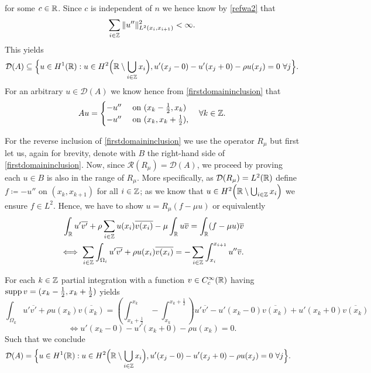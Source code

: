 for some $c \in \mathbb{R}$. Since $c$ is independent of $n$ we hence know by \eqref{refwa2} that
	\[ \sum_{i \in \mathbb{Z}} \|u''\|^{2}_{L^{2}(x_{i}, x_{i+1})} < \infty. \]
This yields
	\begin{equation}
		\mathcal{D}(A) \subseteq \Big\{ u \in H^{1}(\mathbb{R}): u \in H^{2}\Big(\mathbb{R} \setminus \bigcup_{i \in \mathbb{Z}} x_{i} \Big), u'(x_{j} - 0) - u'(x_{j} + 0) - \rho u(x_{j}) = 0 ~\forall j \Big\}. \label{firstdomaininclusion} 
	\end{equation}
For an arbitrary $u \in \mathcal{D}(A)$ we know hence from \eqref{firstdomaininclusion} that
	\[ A u = \begin{cases}
					- u'' & \text{ on } (x_{k} - \frac{1}{2}, x_{k}) \\
					- u'' & \text{ on } (x_{k}, x_{k} + \frac{1}{2}),
			 \end{cases} \quad \forall k \in \mathbb{Z}. \]

For the reverse inclusion of \eqref{firstdomaininclusion} we use the operator $R_{\mu}$ but first let us, again for brevity, denote with $B$ the right-hand side of \eqref{firstdomaininclusion}. Now, since $\mathcal{R}(R_{\mu}) = \mathcal{D}(A)$, we proceed by proving each $u \in B$ is also in the range of $R_{\mu}$. More specifically, as $\mathcal{D}(R_{\mu}) = L^{2}(\mathbb{R})$ define $f \coloneqq - u''$ on $(x_{k}, x_{k + 1})$ for all $i \in \mathbb{Z}$; as we know that $u \in H^{2}\Big(\mathbb{R} \setminus \bigcup_{i \in \mathbb{Z}} x_{i} \Big)$ we ensure $f \in L^{2}$. 
Hence, we have to show $u = R_{\mu}(f - \mu u)$ or equivalently
	\begin{align*}
		 \int_{\mathbb{R}} u' \overline{v'} + \rho \sum_{i \in \mathbb{Z}} u(x_{i}) \overline{v(x_{i})} - \mu \int_{\mathbb{R}} u \overline{v}= \int_{\mathbb{R}}(f-\mu u) \overline{v} \\
		\iff \sum_{i \in \mathbb{Z}} \int_{\Omega_{i}} u' \overline{v'} + \rho u(x_{i}) \overline{v(x_{i})} = - \sum_{i \in \mathbb{Z}} \int_{x_{i}}^{x_{i+1}} u'' \overline{v}.
	\end{align*}


	For each $k \in \mathbb{Z}$ partial integration with a function $v \in C_{c}^{\infty}(\mathbb{R})$ having $\operatorname{supp} v = (x_{k} - \frac{1}{2}, x_{k} + \frac{1}{2})$ yields
	\[ \int_{\Omega_{k}} u' \overline{v'} + \rho u(x_{k}) \overline{v(x_{k})} =\left( \int_{x_{k} + \frac{1}{2}}^{x_{k}} - \int_{x_{k}}^{x_{k} +\frac{1}{2}} \right) u' \overline{v'} - u'(x_{k}-0) \overline{v(x_{k})}  + u'(x_{k}+0) \overline{v(x_{k})}  \]
	\[ \iff u'(x_{k}-0) - u'(x_{k}+0) - \rho u(x_{k}) = 0. \]
	Such that we conclude
	\begin{align*}
		\mathcal{D}(A) & = \Big\{ u \in H^{1}(\mathbb{R}): u \in H^{2}\Big(\mathbb{R} \setminus \bigcup_{i \in \mathbb{Z}} x_{i} \Big), u'(x_{j} - 0) - u'(x_{j} + 0) - \rho u(x_{j}) = 0 ~\forall j \Big\}.
	\end{align*}


